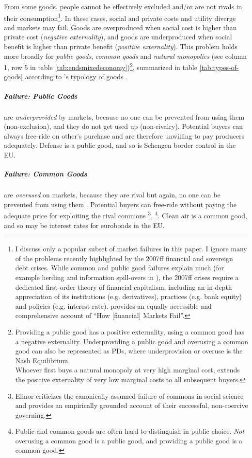 From some goods, people cannot be effectively excluded and/or are not rivals in their consumption\footnote{
	I discuss only a popular subset of market failures in this paper. I ignore many of the problems recently highlighted by the 2007ff financial and sovereign debt crises. While common and public good failures explain much (for example herding and information spill-overs in \citealt{Banerjee-1992-aa}), the 2007ff crises require a dedicated first-order theory of financial capitalism, including an in-depth appreciation of its institutions (e.g. derivatives), practices (e.g. bank equity) and policies (e.g. interest rate). \cite{Cassidy2010} provides an equally accessible and comprehensive account of ``How [financial] Markets Fail''.}. %
In these cases, social and private costs and utility diverge and markets may fail. Goods are overproduced when social cost is higher than private cost (\emph{negative externality}), and goods are underproduced when social benefit is higher than private benefit (\emph{positive externality}). This problem holds more broadly for \emph{public goods}, \emph{common goods} and \emph{natural monopolies} (see column 1, row 5 in table \ref{tab:endsmixedeconomy})\footnote{
	Providing a public good has a positive externality, using a common good has a negative externality. Underproviding a public good and overusing a common good can also be represented as \glspl{PD}, where underprovision or overuse is the Nash Equilibrium. \\ Whoever first buys a natural monopoly at very high marginal cost, extends the positive externality of very low marginal costs to all subsequent buyers.}, 
summarized in table \ref{tab:types-of-goods} according to \citeauthor{Samuelson-1954-eu}'s typology of goods \citeyearpar{Samuelson-1954-eu}. 



\subparagraph{Failure: Public Goods}  \label{sec:publicgood} are \emph{underprovided} by markets, because no one can be prevented from using them (non-exclusion), and they do not get used up (non-rivalry). Potential buyers can always free-ride on other's purchase and are therefore unwilling to pay producers adequately. Defense is a public good, and so is Schengen border control in the \gls{EU}. 

\subparagraph{Failure: Common Goods}  \label{sec:commongood} are \emph{overused} on markets, because they are rival but again, no one can be prevented from using them \citep{Hardin-1968-aa}. Potential buyers can free-ride without paying the adequate price for exploiting the rival commons \citep{Hardin-1968-aa}\footnote{
	Elinor \cite{Ostrom1990} criticizes the canonically assumed failure of commons in social science and provides an empirically grounded account of their successful, non-coercive governing.}, 
	\footnote{Public and common goods are often hard to distinguish in public choice. \emph{Not} overusing a common good is a public good, and providing a public good is a common good.}.
Clean air is a common good, and so may be interest rates for eurobonds in the \gls{EU}. 

